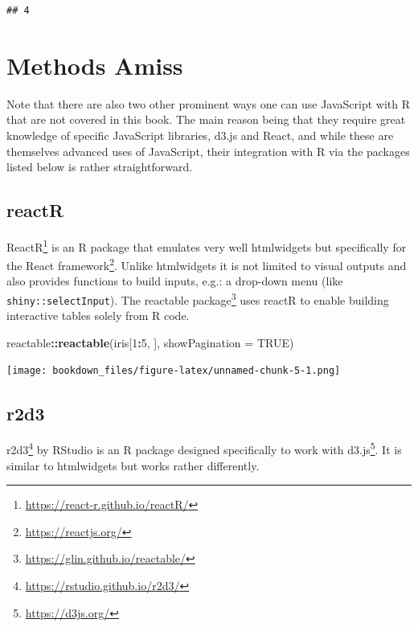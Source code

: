 \documentclass[
]{krantz}
\makeatletter
\newenvironment{Shaded}{\begin{snugshade}}{\end{snugshade}}
\newcommand{\DataTypeTok}[1]{\textcolor[rgb]{0.27,0.27,0.27}{#1}}
\newcommand{\DecValTok}[1]{\textcolor[rgb]{0.06,0.06,0.06}{#1}}
\newcommand{\KeywordTok}[1]{\textcolor[rgb]{0.27,0.27,0.27}{\textbf{#1}}}
\newcommand{\NormalTok}[1]{#1}
\newcommand{\OperatorTok}[1]{\textcolor[rgb]{0.43,0.43,0.43}{\textbf{#1}}}
\newcommand{\OtherTok}[1]{\textcolor[rgb]{0.37,0.37,0.37}{#1}}
\renewcommand{\href}[2]{#2\footnote{\url{#1}}}
\newenvironment{kframe}{%
\medskip{}
\setlength{\fboxsep}{.8em}
 \def\at@end@of@kframe{}%
 \ifinner\ifhmode%
  \def\at@end@of@kframe{\end{minipage}}%
  \begin{minipage}{\columnwidth}%
 \fi\fi%
 \def\FrameCommand##1{\hskip\@totalleftmargin \hskip-\fboxsep
 \colorbox{shadecolor}{##1}\hskip-\fboxsep
     \hskip-\linewidth \hskip-\@totalleftmargin \hskip\columnwidth}%
 \MakeFramed {\advance\hsize-\width
   \@totalleftmargin\z@ \linewidth\hsize
   \@setminipage}}%
 {\par\unskip\endMakeFramed%
 \at@end@of@kframe}
\renewenvironment{Shaded}{\begin{kframe}}{\end{kframe}}
\makeatother
\begin{document}
\begin{verbatim}
## 4
\end{verbatim}

\hypertarget{methods-amiss}{%
\section{Methods Amiss}\label{methods-amiss}}

Note that there are also two other prominent ways one can use JavaScript with R that are not covered in this book. The main reason being that they require great knowledge of specific JavaScript libraries, d3.js and React, and while these are themselves advanced uses of JavaScript, their integration with R via the packages listed below is rather straightforward.

\hypertarget{reactr}{%
\subsection{reactR}\label{reactr}}

\href{https://react-r.github.io/reactR/}{ReactR} \citep{R-reactR} is an R package that emulates very well htmlwidgets but specifically for the \href{https://reactjs.org/}{React framework}. Unlike htmlwidgets it is not limited to visual outputs and also provides functions to build inputs, e.g.: a drop-down menu (like \texttt{shiny::selectInput}). The \href{https://glin.github.io/reactable/}{reactable package} \citep{R-reactable} uses reactR to enable building interactive tables solely from R code.

\begin{Shaded}
\begin{Highlighting}[]
\NormalTok{reactable}\OperatorTok{::}\KeywordTok{reactable}\NormalTok{(iris[}\DecValTok{1}\OperatorTok{:}\DecValTok{5}\NormalTok{, ], }\DataTypeTok{showPagination =} \OtherTok{TRUE}\NormalTok{)}
\end{Highlighting}
\end{Shaded}

\texttt{[image: bookdown\_files/figure-latex/unnamed-chunk-5-1.png]}

\hypertarget{r2d3}{%
\subsection{r2d3}\label{r2d3}}

\href{https://rstudio.github.io/r2d3/}{r2d3} \citep{R-r2d3} by RStudio is an R package designed specifically to work with \href{https://d3js.org/}{d3.js}. It is similar to htmlwidgets but works rather differently.
\end{document}
